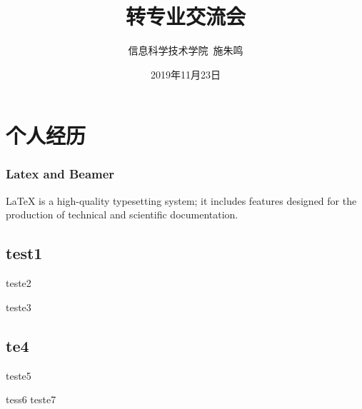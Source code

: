 \documentclass[12pt,AutoFakeBold]{beamer}
\author{信息科学技术学院\ 施朱鸣}
\title{转专业交流会}
\date{2019年11月23日}
\begin{document}
    \frame[plain]{\titlepage}
    \section{个人经历}
    \begin{frame}
        \frametitle{Latex and Beamer}
        LaTeX is a high-quality typesetting system;
        \pause 
        it includes features designed for the production of 
        technical and scientific documentation.
        \subsection{test1}
        teste2
        \par
        teste3
        \subsection{te4}
        teste5
        \par
        tess6
        teste7
    \end{frame}
\end{document}
